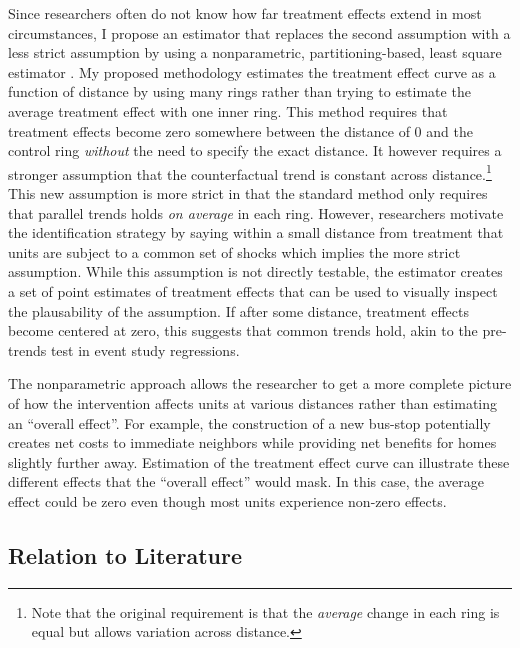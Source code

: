 \documentclass[10pt]{article}
\begin{document}
Since researchers often do not know how far treatment effects extend in most circumstances, I propose an estimator that replaces the second assumption with a less strict assumption by using a nonparametric, partitioning-based, least square estimator \citep{Cattaneo_Crump_Farrell_Feng_2019,Cattaneo_Farrell_Feng_2019}. My proposed methodology estimates the treatment effect curve as a function of distance by using many rings rather than trying to estimate the average treatment effect with one inner ring. This method requires that treatment effects become zero somewhere between the distance of 0 and the control ring \emph{without} the need to specify the exact distance. It however requires a stronger assumption that the counterfactual trend is constant across distance.\footnote{Note that the original requirement is that the \emph{average} change in each ring is equal but allows variation across distance.} This new assumption is more strict in that the standard method only requires that parallel trends holds \emph{on average} in each ring. However, researchers motivate the identification strategy by saying within a small distance from treatment that units are subject to a common set of shocks which implies the more strict assumption. While this assumption is not directly testable, the estimator creates a set of point estimates of treatment effects that can be used to visually inspect the plausability of the assumption. If after some distance, treatment effects become centered at zero, this suggests that common trends hold, akin to the pre-trends test in event study regressions.

The nonparametric approach allows the researcher to get a more complete picture of how the intervention affects units at various distances rather than estimating an ``overall effect''. For example, the construction of a new bus-stop potentially creates net costs to immediate neighbors while providing net benefits for homes slightly further away. Estimation of the treatment effect curve can illustrate these different effects that the ``overall effect'' would mask. In this case, the average effect could be zero even though most units experience non-zero effects.

\subsection{Relation to Literature}
\end{document}
